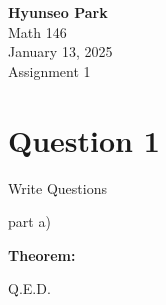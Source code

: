 \documentclass[10pt]{article}
\begin{document}
\begin{center}
    \textbf{Hyunseo Park} \\
    Math 146 \\
    January 13, 2025 \\
    Assignment 1
\end{center}

\section*{\centering Question 1}

\blueline

\begin{enumerate}[{$[$}1{$]$}]
    \item Write Questions
    \begin{enumerate}[{$[$}a{$]$}]
        \item part a)
    \end{enumerate}
\end{enumerate}


\blueline

\vspace{0.5cm}

\vspace{0.5cm}
\begin{center}
    \textbf{Theorem: }
    

\end{center}

\begin{proofb}



\end{proofb}
\vspace{0.5cm}

\begin{center}
    Q.E.D.
\end{center}
\end{document}
